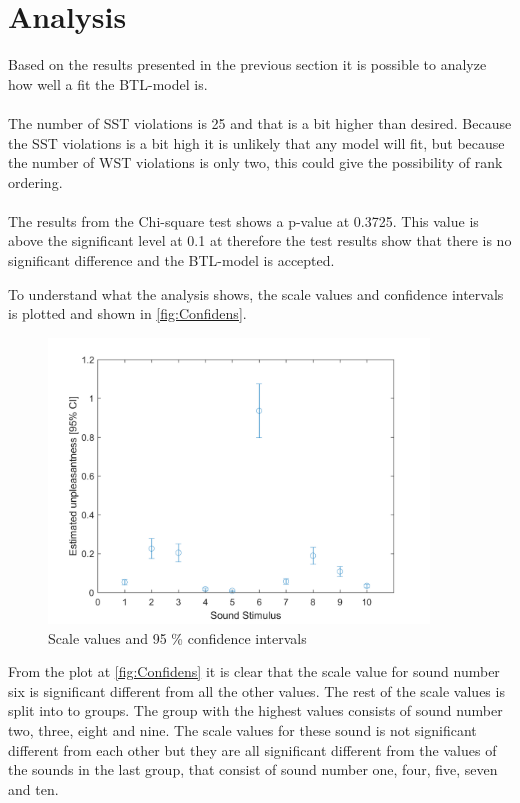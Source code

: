 \section*{Analysis}
\label{Analyse}
%
Based on the results presented in the previous section it is possible to analyze how well a fit the BTL-model is. 
\\\\
The number of SST violations is 25 and that is a bit higher than desired. Because the SST violations is a bit high it is unlikely that any model will fit, but because the number of WST violations is only two, this could give the possibility of rank ordering. 
\\\\
The results from the Chi-square test shows a p-value at 0.3725. This value is above the significant level at 0.1 at therefore the test results show that there is no significant difference and the BTL-model is accepted. 

\noindent To understand what the analysis shows, the scale values and confidence intervals is plotted and shown in \autoref{fig:Confidens}. 

\begin{figure}[H]
\centering
\includegraphics[width = 0.90\textwidth]{Figure/Confidens.png} 
\caption{Scale values and 95 \% confidence intervals}
\label{fig:Confidens}
\end{figure}

\noindent From the plot at \autoref{fig:Confidens} it is clear that the scale value for sound number six is significant different from all the other values. The rest of the scale values is split into to groups. The group with the highest values consists of sound number two, three, eight and nine. The scale values for these sound is not significant different from each other but they are all significant different from the values of the sounds in the last group, that consist of sound number one, four, five, seven and ten. 



